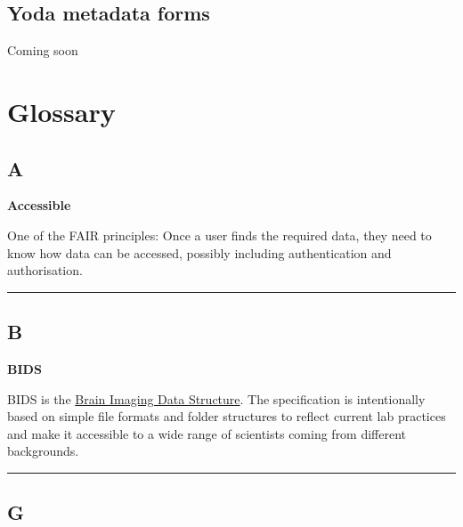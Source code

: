 \documentclass[
  letterpaper,
  DIV=11,
  numbers=noendperiod]{scrreprt}
\begin{document}
\section{Yoda metadata forms}\label{yoda-metadata-forms}

Coming soon


\chapter*{Glossary}\label{glossary}


\section*{A}\label{sec-a}


\textbf{Accessible}

One of the FAIR principles: Once a user finds the required data, they
need to know how data can be accessed, possibly including authentication
and authorisation.

\begin{center}\rule{0.5\linewidth}{0.5pt}\end{center}

\section*{B}\label{sec-b}


\textbf{BIDS}

BIDS is the \href{https://bids.neuroimaging.io/}{Brain Imaging Data
Structure}. The specification is intentionally based on simple file
formats and folder structures to reflect current lab practices and make
it accessible to a wide range of scientists coming from different
backgrounds.

\begin{center}\rule{0.5\linewidth}{0.5pt}\end{center}

\section*{G}\label{sec-g}
\end{document}
